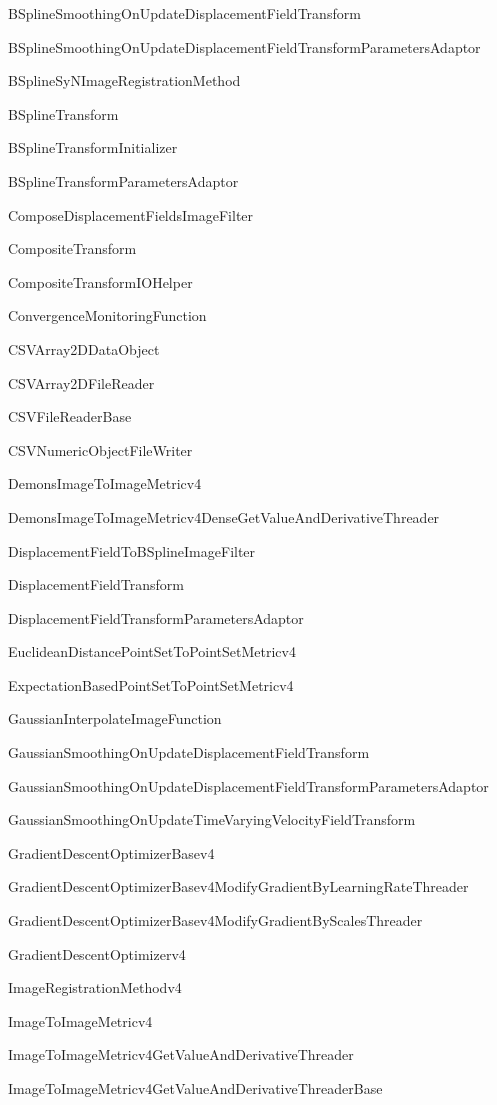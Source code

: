 \documentclass{frontiersSCNS}
\begin{document}
BSplineSmoothingOnUpdateDisplacementFieldTransform

BSplineSmoothingOnUpdateDisplacementFieldTransformParametersAdaptor 

BSplineSyNImageRegistrationMethod

BSplineTransform

BSplineTransformInitializer

BSplineTransformParametersAdaptor

ComposeDisplacementFieldsImageFilter

CompositeTransform

CompositeTransformIOHelper

ConvergenceMonitoringFunction

CSVArray2DDataObject

CSVArray2DFileReader

CSVFileReaderBase

CSVNumericObjectFileWriter 

DemonsImageToImageMetricv4

DemonsImageToImageMetricv4DenseGetValueAndDerivativeThreader

DisplacementFieldToBSplineImageFilter

DisplacementFieldTransform 

DisplacementFieldTransformParametersAdaptor

EuclideanDistancePointSetToPointSetMetricv4

ExpectationBasedPointSetToPointSetMetricv4

GaussianInterpolateImageFunction

GaussianSmoothingOnUpdateDisplacementFieldTransform 

GaussianSmoothingOnUpdateDisplacementFieldTransformParametersAdaptor

GaussianSmoothingOnUpdateTimeVaryingVelocityFieldTransform

GradientDescentOptimizerBasev4

GradientDescentOptimizerBasev4ModifyGradientByLearningRateThreader

GradientDescentOptimizerBasev4ModifyGradientByScalesThreader

GradientDescentOptimizerv4

ImageRegistrationMethodv4

ImageToImageMetricv4

ImageToImageMetricv4GetValueAndDerivativeThreader

ImageToImageMetricv4GetValueAndDerivativeThreaderBase
\end{document}
